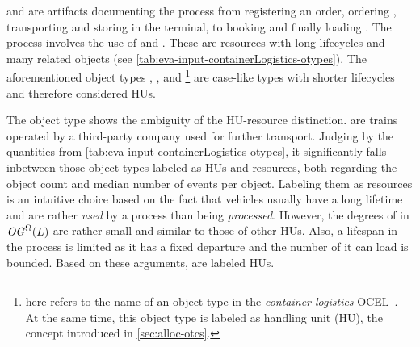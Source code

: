  and  are artifacts documenting the process from registering an order, ordering , transporting and storing  in the terminal, to booking and finally loading .
The process involves the use of  and . These are resources with long lifecycles and many related objects (see \autoref{tab:eva-input-containerLogistics-otypes}).
The aforementioned object types , ,  and 
\footnote{ here refers to the name of an object type in the \textit{container logistics} OCEL~\cite{containerLogistics}. At the same time, this object type is labeled as handling unit (HU), the concept introduced in \autoref{sec:alloc-otcs}.}
are case-like types with shorter lifecycles and therefore considered HUs.

The  object type shows the ambiguity of the HU-resource distinction.  are trains operated by a third-party company used for further transport. Judging by the quantities from \autoref{tab:eva-input-containerLogistics-otypes}, it significantly falls inbetween those object types labeled as HUs and resources, both regarding the object count and median number of events per object.
Labeling them as resources is an intuitive choice based on the fact that vehicles usually have a long lifetime and are rather \textit{used} by a process than being \textit{processed}.
However, the degrees of  in $\mathit{OG}^\Omega(L)$ are rather small and similar to those of other HUs. Also, a  lifespan in the process is limited as it has a fixed departure and the number of  it can load is bounded.
Based on these arguments,  are labeled HUs.

